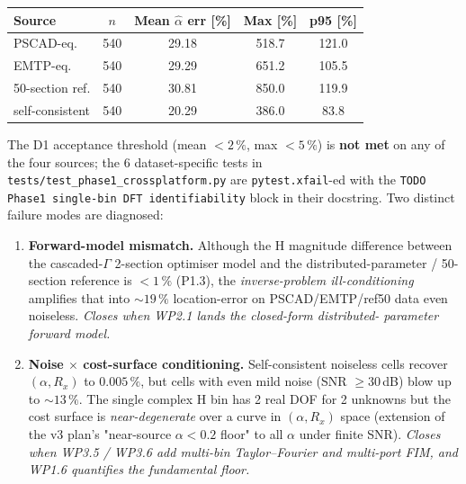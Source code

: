 \documentclass[11pt,a4paper]{article}
\begin{document}
\begin{longtable}{lcccc}
\toprule
\textbf{Source} & \textbf{$n$} & \textbf{Mean $\hat\alpha$ err [\%]}
                              & \textbf{Max [\%]} & \textbf{p95 [\%]} \\
\midrule
PSCAD-eq.       & 540 & 29.18  & 518.7 & 121.0 \\
EMTP-eq.        & 540 & 29.29  & 651.2 & 105.5 \\
50-section ref. & 540 & 30.81  & 850.0 & 119.9 \\
self-consistent & 540 & 20.29  & 386.0 &  83.8 \\
\bottomrule
\end{longtable}

\noindent
The D1 acceptance threshold (mean $<2\,\%$, max $<5\,\%$) is
\textbf{not met} on any of the four sources; the 6 dataset-specific
tests in \texttt{tests/test\_phase1\_crossplatform.py} are
\texttt{pytest.xfail}-ed with the
\texttt{TODO Phase1 single-bin DFT identifiability} block in their
docstring.  Two distinct failure modes are diagnosed:

\begin{enumerate}[leftmargin=2em]
  \item \textbf{Forward-model mismatch.}  Although the H magnitude
        difference between the cascaded-$\Gamma$ 2-section optimiser
        model and the distributed-parameter / 50-section reference
        is $<1\,\%$ (P1.3), the \textit{inverse-problem
        ill-conditioning} amplifies that into $\sim 19\,\%$
        location-error on PSCAD/EMTP/ref50 data even noiseless.
        \textit{Closes when WP2.1 lands the closed-form distributed-
        parameter forward model.}
  \item \textbf{Noise $\times$ cost-surface conditioning.}
        Self-consistent noiseless cells recover $(\alpha,R_x)$ to
        $0.005\,\%$, but cells with even mild noise (SNR $\geq 30$\,dB)
        blow up to $\sim 13\,\%$.  The single complex H bin has 2
        real DOF for 2 unknowns but the cost surface is
        \textit{near-degenerate} over a curve in $(\alpha, R_x)$
        space (extension of the v3 plan's "near-source $\alpha<0.2$
        floor" to all $\alpha$ under finite SNR).
        \textit{Closes when WP3.5 / WP3.6 add multi-bin
        Taylor--Fourier and multi-port FIM, and WP1.6 quantifies the
        fundamental floor.}
\end{enumerate}
\end{document}
